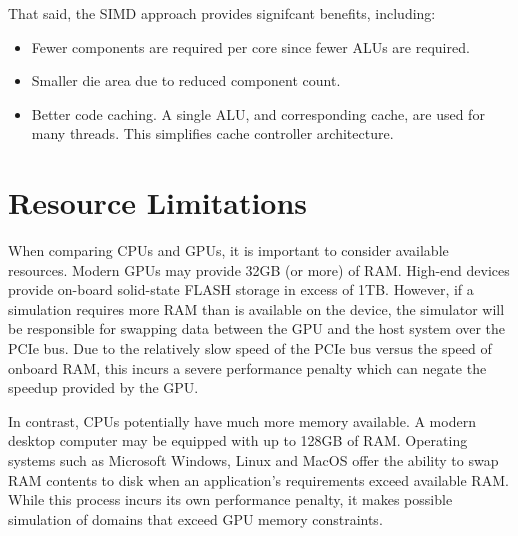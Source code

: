 That said, the SIMD approach provides signifcant benefits, including:

\begin{itemize}
	\item Fewer components are required per core since fewer ALUs are required.
	\item Smaller die area due to reduced component count.
	\item Better code caching. A single ALU, and corresponding cache, are used for many threads. This simplifies cache controller architecture.
\end{itemize}

\section{Resource Limitations}

When comparing CPUs and GPUs, it is important to consider available resources. Modern GPUs may provide 32GB (or more) of RAM.  High-end devices provide on-board solid-state FLASH storage in excess of 1TB. However, if a simulation requires more RAM than is available on the device, the simulator will be responsible for swapping data between the GPU and the host system over the PCIe bus. Due to the relatively slow speed of the PCIe bus versus the speed of onboard RAM, this incurs a severe performance penalty which can negate the speedup provided by the GPU. 

In contrast, CPUs potentially have much more memory available. A modern desktop computer may be equipped with up to 128GB of RAM. Operating systems such as Microsoft Windows, Linux and MacOS offer the ability to swap RAM contents to disk when an application's requirements exceed available RAM. While this process incurs its own performance penalty, it makes possible simulation of domains that exceed GPU memory constraints.





